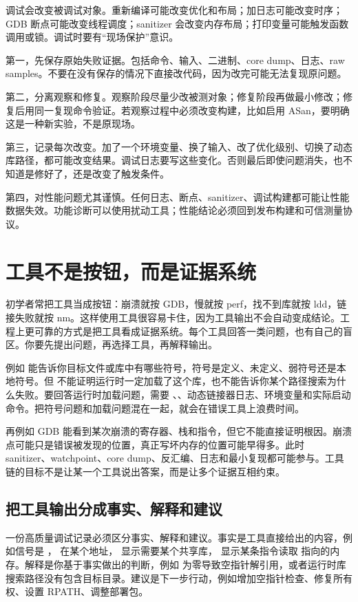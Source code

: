 调试会改变被调试对象。重新编译可能改变优化和布局；加日志可能改变时序；GDB 断点可能改变线程调度；sanitizer 会改变内存布局；打印变量可能触发函数调用或锁。调试时要有“现场保护”意识。

第一，先保存原始失败证据。包括命令、输入、二进制、core dump、日志、raw samples。不要在没有保存的情况下直接改代码，因为改完可能无法复现原问题。

第二，分离观察和修复。观察阶段尽量少改被测对象；修复阶段再做最小修改；修复后用同一复现命令验证。若观察过程中必须改变构建，比如启用 ASan，要明确这是一种新实验，不是原现场。

第三，记录每次改变。加了一个环境变量、换了输入、改了优化级别、切换了动态库路径，都可能改变结果。调试日志要写这些变化。否则最后即使问题消失，也不知道是修好了，还是改变了触发条件。

第四，对性能问题尤其谨慎。任何日志、断点、sanitizer、调试构建都可能让性能数据失效。功能诊断可以使用扰动工具；性能结论必须回到发布构建和可信测量协议。

\section{工具不是按钮，而是证据系统}

初学者常把工具当成按钮：崩溃就按 GDB，慢就按 perf，找不到库就按 ldd，链接失败就按 nm。这样使用工具很容易卡住，因为工具输出不会自动变成结论。工程上更可靠的方式是把工具看成证据系统。每个工具回答一类问题，也有自己的盲区。你要先提出问题，再选择工具，再解释输出。

例如  能告诉你目标文件或库中有哪些符号，符号是定义、未定义、弱符号还是本地符号。但  不能证明运行时一定加载了这个库，也不能告诉你某个路径搜索为什么失败。要回答运行时加载问题，需要 、、动态链接器日志、环境变量和实际启动命令。把符号问题和加载问题混在一起，就会在错误工具上浪费时间。

再例如 GDB 能看到某次崩溃的寄存器、栈和指令，但它不能直接证明根因。崩溃点可能只是错误被发现的位置，真正写坏内存的位置可能早得多。此时 sanitizer、watchpoint、core dump、反汇编、日志和最小复现都可能参与。工具链的目标不是让某一个工具说出答案，而是让多个证据互相约束。

\subsection{把工具输出分成事实、解释和建议}

一份高质量调试记录必须区分事实、解释和建议。事实是工具直接给出的内容，例如信号是 ， 在某个地址， 显示需要某个共享库， 显示某条指令读取  指向的内存。解释是你基于事实做出的判断，例如  为零导致空指针解引用，或者运行时库搜索路径没有包含目标目录。建议是下一步行动，例如增加空指针检查、修复所有权、设置 RPATH、调整部署包。

